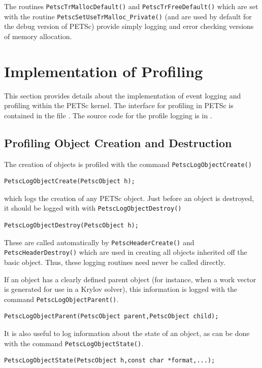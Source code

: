 The routines \lstinline{PetscTrMallocDefault()} and \lstinline{PetscTrFreeDefault()} which are set with the routine \lstinline{PetscSetUseTrMalloc_Private()} (and are used by default for the debug version of PETSc) provide simply logging and error checking versions of memory allocation.



\section{Implementation of Profiling}
\label{sec:profimpl}

This section provides details about the implementation of event
logging and profiling within the PETSc kernel.
The interface for profiling in PETSc is contained in the file
\href{http://www.mcs.anl.gov/petsc/petsc-master/include/petsclog.h.html}{}. The source code for the profile logging
is in .

\subsection{Profiling Object Creation and Destruction}

The creation of objects is profiled with the command
 \lstinline{PetscLogObjectCreate()}
\begin{lstlisting}
PetscLogObjectCreate(PetscObject h);
\end{lstlisting}
which logs the creation of any PETSc object.
Just before an object is destroyed, it should be  logged with
with \lstinline{PetscLogObjectDestroy()}
\begin{lstlisting}
PetscLogObjectDestroy(PetscObject h);
\end{lstlisting}
These are called automatically by \lstinline{PetscHeaderCreate()} and
\lstinline{PetscHeaderDestroy()} which are used in creating all objects
inherited off the basic object. Thus, these logging routines need
never be called directly.

If an object has a clearly defined parent object (for instance, when
a work vector is generated for use in a Krylov solver), this information
is logged with the command \lstinline{PetscLogObjectParent()}.
\begin{lstlisting}
PetscLogObjectParent(PetscObject parent,PetscObject child);
\end{lstlisting}
It is also useful to log information about the state of an object, as can
be done with the command \lstinline{PetscLogObjectState()}.
\begin{lstlisting}
PetscLogObjectState(PetscObject h,const char *format,...);
\end{lstlisting}

